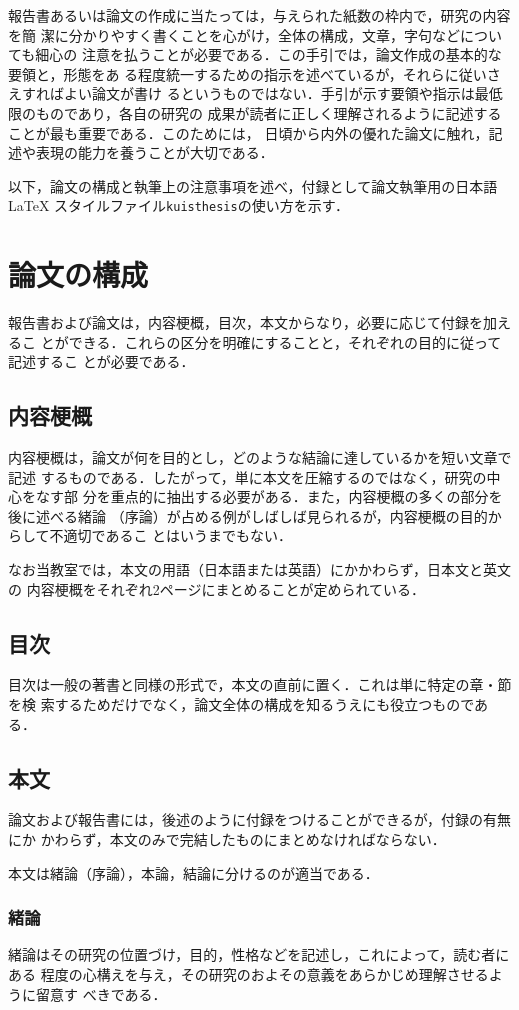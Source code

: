 \documentclass[master]{kuisthesis}		%
\begin{document}
報告書あるいは論文の作成に当たっては，与えられた紙数の枠内で，研究の内容を簡
潔に分かりやすく書くことを心がけ，全体の構成，文章，字句などについても細心の
注意を払うことが必要である．この手引では，論文作成の基本的な要領と，形態をあ
る程度統一するための指示を述べているが，それらに従いさえすればよい論文が書け
るというものではない．手引が示す要領や指示は最低限のものであり，各自の研究の
成果が読者に正しく理解されるように記述することが最も重要である．このためには，
日頃から内外の優れた論文に触れ，記述や表現の能力を養うことが大切である．

以下，論文の構成と執筆上の注意事項を述べ，付録として論文執筆用の日本語\LaTeX 
スタイルファイル\verb|kuisthesis|の使い方を示す．

\section{論文の構成}\label{sec-structure}
報告書および論文は，内容梗概，目次，本文からなり，必要に応じて付録を加えるこ
とができる．これらの区分を明確にすることと，それぞれの目的に従って記述するこ
とが必要である．

\subsection{内容梗概}\label{subsec-abstract}
内容梗概は，論文が何を目的とし，どのような結論に達しているかを短い文章で記述
するものである．したがって，単に本文を圧縮するのではなく，研究の中心をなす部
分を重点的に抽出する必要がある．また，内容梗概の多くの部分を後に述べる緒論
（序論）が占める例がしばしば見られるが，内容梗概の目的からして不適切であるこ
とはいうまでもない．

なお当教室では，本文の用語（日本語または英語）にかかわらず，日本文と英文の
内容梗概をそれぞれ2ページにまとめることが定められている．

\subsection{目次}\label{subsec-toc}
目次は一般の著書と同様の形式で，本文の直前に置く．これは単に特定の章・節を検
索するためだけでなく，論文全体の構成を知るうえにも役立つものである．

\subsection{本文}\label{subsec-main}
論文および報告書には，後述のように付録をつけることができるが，付録の有無にか
かわらず，本文のみで完結したものにまとめなければならない．

本文は緒論（序論），本論，結論に分けるのが適当である．

\subsubsection{緒論}\label{subsubsec-intro}
緒論はその研究の位置づけ，目的，性格などを記述し，これによって，読む者にある
程度の心構えを与え，その研究のおよその意義をあらかじめ理解させるように留意す
べきである．
\end{document}
